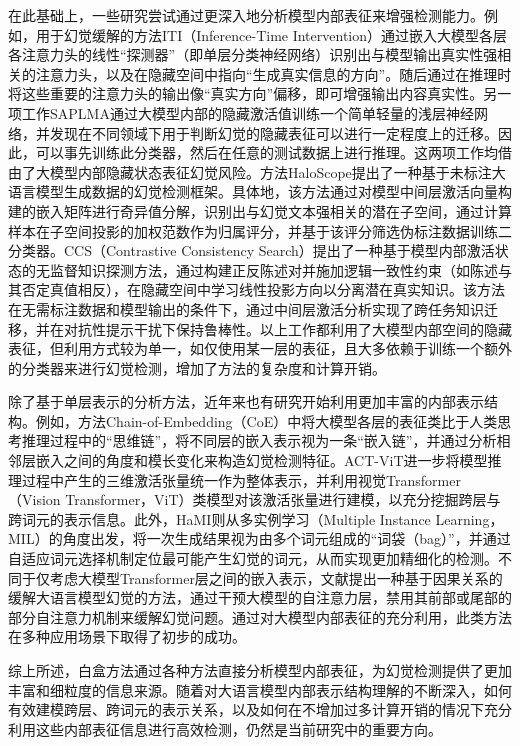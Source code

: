 在此基础上，一些研究尝试通过更深入地分析模型内部表征来增强检测能力。例如，用于幻觉缓解的方法ITI（Inference-Time Intervention）\cite{li2023inference}通过嵌入大模型各层各注意力头的线性“探测器”（即单层分类神经网络）识别出与模型输出真实性强相关的注意力头，以及在隐藏空间中指向“生成真实信息的方向”。随后通过在推理时将这些重要的注意力头的输出像“真实方向”偏移，即可增强输出内容真实性。另一项工作SAPLMA\cite{azaria2023internal}通过大模型内部的隐藏激活值训练一个简单轻量的浅层神经网络，并发现在不同领域下用于判断幻觉的隐藏表征可以进行一定程度上的迁移。因此，可以事先训练此分类器，然后在任意的测试数据上进行推理。这两项工作均借由了大模型内部隐藏状态表征幻觉风险。方法HaloScope\cite{du2024haloscope}提出了一种基于未标注大语言模型生成数据的幻觉检测框架。具体地，该方法通过对模型中间层激活向量构建的嵌入矩阵进行奇异值分解，识别出与幻觉文本强相关的潜在子空间，通过计算样本在子空间投影的加权范数作为归属评分，并基于该评分筛选伪标注数据训练二分类器。CCS（Contrastive Consistency Search）\cite{burns2023discovering}提出了一种基于模型内部激活状态的无监督知识探测方法，通过构建正反陈述对并施加逻辑一致性约束（如陈述与其否定真值相反），在隐藏空间中学习线性投影方向以分离潜在真实知识。该方法在无需标注数据和模型输出的条件下，通过中间层激活分析实现了跨任务知识迁移，并在对抗性提示干扰下保持鲁棒性。以上工作都利用了大模型内部空间的隐藏表征，但利用方式较为单一，如仅使用某一层的表征，且大多依赖于训练一个额外的分类器来进行幻觉检测，增加了方法的复杂度和计算开销。

除了基于单层表示的分析方法，近年来也有研究开始利用更加丰富的内部表示结构。例如，方法Chain-of-Embedding（CoE）\cite{wang2025latent}中将大模型各层的表征类比于人类思考推理过程中的“思维链”，将不同层的嵌入表示视为一条“嵌入链”，并通过分析相邻层嵌入之间的角度和模长变化来构造幻觉检测特征。ACT-ViT\cite{bar2025beyond}进一步将模型推理过程中产生的三维激活张量统一作为整体表示，并利用视觉Transformer（Vision Transformer，ViT）类模型对该激活张量进行建模，以充分挖掘跨层与跨词元的表示信息。此外，HaMI\cite{niu2025robust}则从多实例学习（Multiple Instance Learning，MIL）的角度出发，将一次生成结果视为由多个词元组成的“词袋（bag）”，并通过自适应词元选择机制定位最可能产生幻觉的词元，从而实现更加精细化的检测。不同于仅考虑大模型Transformer层之间的嵌入表示，文献提出一种基于因果关系的缓解大语言模型幻觉的方法，通过干预大模型的自注意力层，禁用其前部或尾部的部分自注意力机制来缓解幻觉问题。通过对大模型内部表征的充分利用，此类方法在多种应用场景下取得了初步的成功。

综上所述，白盒方法通过各种方法直接分析模型内部表征，为幻觉检测提供了更加丰富和细粒度的信息来源。随着对大语言模型内部表示结构理解的不断深入，如何有效建模跨层、跨词元的表示关系，以及如何在不增加过多计算开销的情况下充分利用这些内部表征信息进行高效检测，仍然是当前研究中的重要方向。

